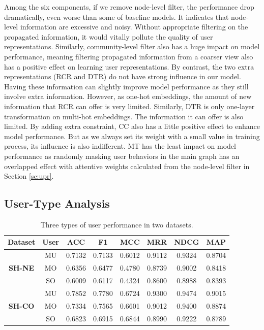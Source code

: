 Among the six components, if we remove node-level filter, the performance drop dramatically, even worse than some of baseline models. It indicates that node-level information are excessive and noisy. Without appropriate filtering on the propagated information, it would vitally pollute the quality of user representations. Similarly,  community-level filter also has a huge impact on model performance, meaning filtering propagated information from a coarser view also has a positive effect on learning user representations. By contrast, the two extra representations (RCR and DTR) do not have strong influence in our model. Having these information can slightly improve model performance as they still involve extra information. However, as one-hot embeddings, the amount of new information that RCR can offer is very limited. Similarly, DTR is only one-layer transformation on multi-hot embeddings. The information it can offer is also limited. By adding extra constraint, CC also has a little positive effect to enhance model performance. But as we always set its weight with a small value in training process, its influence is also indifferent. MT has the least impact on model performance as randomly masking user behaviors in the main graph has an overlapped effect with attentive weights calculated from the node-level filter in Section \ref{sc:upr}.

\subsection{User-Type Analysis}
\label{sc:ua}
\begin{table}[h]
	
	\centering
	\begin{tabular}{cccccccc} 
		\toprule
		\textbf{Dataset}& \textbf{User}	
		& \textbf{ACC}& \textbf{F1}& \textbf{MCC}& \textbf{MRR} & \textbf{NDCG}& \textbf{MAP}\\ \midrule 
		\multirow{3}{*}{ \textbf{SH-NE}} & MU & 0.7132 & 0.7133 & 0.6012&  0.9112 & 0.9324 & 0.8704  \\   
		& MO & 0.6356 & 0.6477 & 0.4780&  0.8739 & 0.9002 & 0.8418 \\
		& SO & 0.6009 & 0.6117 & 0.4324&  0.8600 & 0.8988 & 0.8393 \\
		\midrule 
		\multirow{3}{*}{ \textbf{SH-CO}} & MU & 0.7852& 0.7780& 0.6724& 0.9300& 0.9474& 0.9015 \\   
		& MO & 0.7334& 0.7565& 0.6601& 0.9012& 0.9400& 0.8874\\
		& SO & 0.6823& 0.6915& 0.6844& 0.8990& 0.9222& 0.8789 \\ \bottomrule
	\end{tabular}
	\caption{Three types of user performance in two datasets.}
	\label{tab:ua}
\end{table} 

